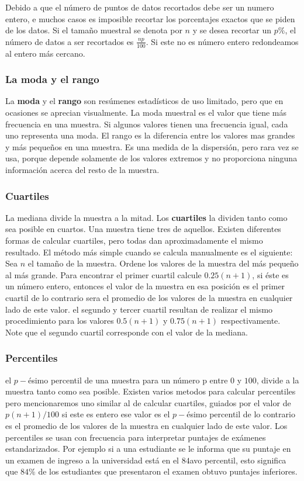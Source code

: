 \documentclass[10pt,a4paper]{book}
\begin{document}
Debido a que el número de puntos de datos recortados debe ser un numero entero, e muchos casos es imposible recortar los porcentajes exactos que se piden de los datos. Si el tamaño muestral se denota por $ n $ y se desea recortar un $ p\% $, el número de datos a ser recortados es $ \frac{np}{100} $. Si este no es número entero redondeamos al entero más cercano.

\subsubsection{La moda y el rango}

La \textbf{moda} y el \textbf{rango} son resúmenes estadísticos de uso limitado, pero que en ocasiones se aprecian visualmente. La moda muestral es el valor que tiene más frecuencia en una muestra. Si algunos valores tienen una frecuencia igual, cada uno representa una moda. El rango es la diferencia entre los valores mas grandes y más pequeños en una muestra. Es una medida de la dispersión, pero rara vez se usa, porque depende solamente de los valores extremos y no proporciona ninguna información acerca del resto de la muestra.

\subsubsection{Cuartiles}

La mediana divide la muestra a la mitad. Los \textbf{cuartiles} la dividen tanto como sea posible en cuartos. Una muestra tiene tres de aquellos. Existen diferentes formas de calcular cuartiles, pero todas dan aproximadamente el mismo resultado. El método más simple cuando se calcula manualmente es el siguiente: Sea $ n $ el tamaño de la muestra. Ordene los valores de la muestra del más pequeño al más grande. Para encontrar el primer cuartil calcule $ 0.25(n+1) $, si éste es un número entero, entonces el valor de la muestra en esa posición es el primer cuartil de lo contrario sera el promedio de los valores de la muestra en cualquier lado de este valor. el segundo y tercer cuartil resultan de realizar el mismo procedimiento para los valores $ 0.5(n+1) $ y $ 0.75(n+1) $ respectivamente. Note que el segundo cuartil corresponde con el valor de la mediana.


\subsubsection{Percentiles}

el $p-$ésimo percentil de una muestra para un número p entre $ 0 $ y $ 100 $, divide a la muestra tanto como sea posible. Existen varios metodos para calcular percentiles pero mencionaremos uno similar al de calcular cuartiles, guiados por el valor de $ p(n+1)/100 $ si este es entero ese valor es el $p-$ésimo percentil de lo contrario es el promedio de los valores de la muestra en cualquier lado de este valor. Los percentiles se usan con frecuencia para interpretar puntajes de exámenes estandarizados. Por ejemplo si a una estudiante se le informa que su puntaje en un examen de ingreso a la universidad está en el $ 84 $avo percentil, esto significa que $ 84\% $ de los estudiantes que presentaron el examen obtuvo puntajes inferiores.
\end{document}
